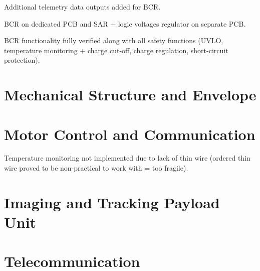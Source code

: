Additional telemetry data outputs added for BCR.

BCR on dedicated PCB and SAR + logic voltages regulator on separate PCB. 

BCR functionality fully verified along with all safety functions (UVLO, temperature monitoring + charge cut-off, charge regulation, short-circuit protection).

\section{Mechanical Structure and Envelope}

\section{Motor Control and Communication}

Temperature monitoring not implemented due to lack of thin wire (ordered thin wire proved to be non-practical to work with = too fragile).


\section{Imaging and Tracking Payload Unit}

\section{Telecommunication}
